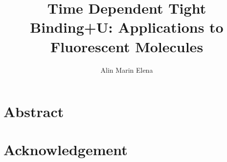 \documentclass[oneside,a4paper,12pt]{aprilthesis}
\title{Time Dependent Tight Binding+U: Applications to Fluorescent Molecules}
\author{Alin Marin Elena}
\affiliation{The Queen's University of Belfast}
\begin{document}
\pagestyle{empty}
\frontmatter
\maketitle
%
%
%
\chapter{Abstract}

%
\chapter{Acknowledgement}

%
\setcounter{tocdepth}{1}
\tableofcontents
%
\glsaddall
\renewcommand{\glossaryname}{Glossary of Symbols}
\printglossaries
\mainmatter
\pagestyle{fancy}





\end{document}
